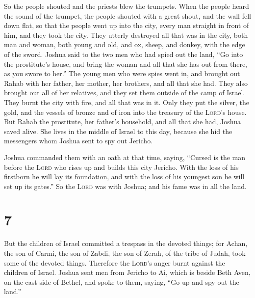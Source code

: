  So the people shouted and the priests blew the trumpets.
When the people heard the sound of the trumpet, the people shouted with
a great shout, and the wall fell down flat, so that the people went up
into the city, every man straight in front of him, and they took the
city.  They utterly destroyed all that was in the city,
both man and woman, both young and old, and ox, sheep, and donkey, with
the edge of the sword.  Joshua said to the two men who
had spied out the land, ``Go into the prostitute's house, and bring the
woman and all that she has out from there, as you swore to her.''
 The young men who were spies went in, and brought out
Rahab with her father, her mother, her brothers, and all that she had.
They also brought out all of her relatives, and they set them outside of
the camp of Israel.  They burnt the city with fire, and
all that was in it. Only they put the silver, the gold, and the vessels
of bronze and of iron into the treasury of the \textsc{Lord}'s house.
 But Rahab the prostitute, her father's household, and
all that she had, Joshua saved alive. She lives in the middle of Israel
to this day, because she hid the messengers whom Joshua sent to spy out
Jericho.

 Joshua commanded them with an oath at that time, saying,
``Cursed is the man before the \textsc{Lord} who rises up and builds
this city Jericho. With the loss of his firstborn he will lay its
foundation, and with the loss of his youngest son he will set up its
gates.''  So the \textsc{Lord} was with Joshua; and his
fame was in all the land.

\hypertarget{section-6}{%
\section{7}\label{section-6}}

 But the children of Israel committed a trespass in the
devoted things; for Achan, the son of Carmi, the son of Zabdi, the son
of Zerah, of the tribe of Judah, took some of the devoted things.
Therefore the \textsc{Lord}'s anger burnt against the children of
Israel.  Joshua sent men from Jericho to Ai, which is
beside Beth Aven, on the east side of Bethel, and spoke to them, saying,
``Go up and spy out the land.''

